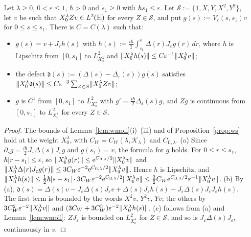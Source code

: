 \begin{lemma}\label{lem:path}
Let $\lambda\ge0$, $0<\varepsilon\le1$, $\hbar>0$ and $s_1\ge0$ with $\hbar s_1\le\varepsilon$. Let $\mathcal S:=\{1,X,Y,X^2,Y^2\}$, let $v$ be such that
$X_0^\lambda Zv\in L^2(\mathbb{H})$ for every $Z\in\mathcal S$, and put
$g(s):=V_\varepsilon(s,s_1)v$ for $0\le s\le s_1$. There is $C=C(\lambda)$ such that:
\begin{itemize}
\item[(a)] $g(s)=v+J_\varepsilon h(s)$ with $h(s):=\tfrac{i\hbar}2\int_{s_1}^s\Delta(r)J_\varepsilon g(r)\,dr$, where $h$ is Lipschitz from
$[0,s_1]$ to $L^2_{X_0^\lambda}$ and $\lVert X_0^\lambda h(s)\rVert\le C\varepsilon^{-1}\lVert X_0^\lambda v\rVert$;
\item[(b)] the defect $\mathfrak d(s):=(\Delta(s)-\Delta_\varepsilon(s))g(s)$ satisfies
$\lVert X_0^\lambda\mathfrak d(s)\rVert\le C\varepsilon^{-3}\sum_{Z\in\mathcal S}\lVert X_0^\lambda Zv\rVert$;
\item[(c)] $g$ is $C^1$ from $[0,s_1]$ to $L^2_{X_0^\lambda}$ with $g'=\tfrac{i\hbar}2\Delta_\varepsilon(s)g$, and $Zg$ is
continuous from $[0,s_1]$ to $L^2_{X_0^\lambda}$ for every $Z\in\mathcal S$.
\end{itemize}
\end{lemma}
\begin{proof}
The bounds of Lemma~\ref{lem:wmoll}(i)--(iii) and of Proposition~\ref{prop:ws} hold at the weight $X_0^\lambda$, with $C_W=C_W(\lambda,\mathcal K_\lambda)$
and $C_{\mathrm{fl},\lambda}$.
(a) Since $\partial_sg=\tfrac{i\hbar}2J_\varepsilon\Delta(s)J_\varepsilon g$ and $g(s_1)=v$, the formula for $g$ holds. For $0\le r\le s_1$,
$\hbar|r-s_1|\le\varepsilon$, so $\lVert X_0^\lambda g(r)\rVert\le\mathrm{e}^{C_{\mathrm{fl},\lambda}/2}\lVert X_0^\lambda v\rVert$ and
$\lVert X_0^\lambda\Delta(r)J_\varepsilon g(r)\rVert\le3C_W\varepsilon^{-2}\mathrm{e}^{C_{\mathrm{fl},\lambda}/2}\lVert X_0^\lambda v\rVert$. Hence $h$ is Lipschitz, and
$\lVert X_0^\lambda h(s)\rVert\le\tfrac12\hbar|s-s_1|\cdot3C_W\varepsilon^{-2}\mathrm{e}^{C_{\mathrm{fl},\lambda}/2}\lVert X_0^\lambda v\rVert\le\tfrac32C_W\mathrm{e}^{C_{\mathrm{fl},\lambda}/2}\varepsilon^{-1}\lVert X_0^\lambda v\rVert$.
(b) By (a),
$\mathfrak d(s)=\Delta(s)v-J_\varepsilon\Delta(s)J_\varepsilon v+\Delta(s)J_\varepsilon h(s)-J_\varepsilon\Delta(s)J_\varepsilon J_\varepsilon h(s)$. The first term is
bounded by the words $X^2v$, $Y^2v$, $Yv$; the others by $3C_W^2\varepsilon^{-2}\lVert X_0^\lambda v\rVert$ and
$(3C_W+3C_W^3)\varepsilon^{-2}\lVert X_0^\lambda h(s)\rVert$. (c) follows from (a) and Lemma~\ref{lem:wmoll}: $ZJ_\varepsilon$ is bounded on
$L^2_{X_0^\lambda}$ for $Z\in\mathcal S$, and so is $J_\varepsilon\Delta(s)J_\varepsilon$, continuously in $s$.
\end{proof}

